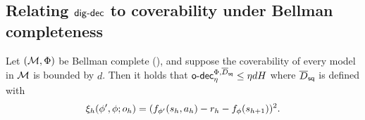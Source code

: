 \subsection{Relating $\mathsf{dig}\text{-}\mathsf{dec}$ to coverability under Bellman completeness}\label{app: related sto coverability}

\begin{lemma}\label{lem: bound coverability bound}
    Let $(\mathcal{M}, \Phi)$ be Bellman complete (), and suppose the coverability of every model in $\mathcal{M}$ is bounded by $d$. Then it holds that $\mathsf{o}\text{-}\mathsf{dec}_\eta^{\Phi, \overline{D}_{\mathsf{sq}}}\leq \eta dH$ where $\overline{D}_{\mathsf{sq}}$ is defined with 
    \begin{align*}
        \xi_h(\phi', \phi; o_h) = (f_{\phi'}(s_h,a_h) - r_h - f_{\phi}(s_{h+1}))^2. 
    \end{align*}
\end{lemma}
